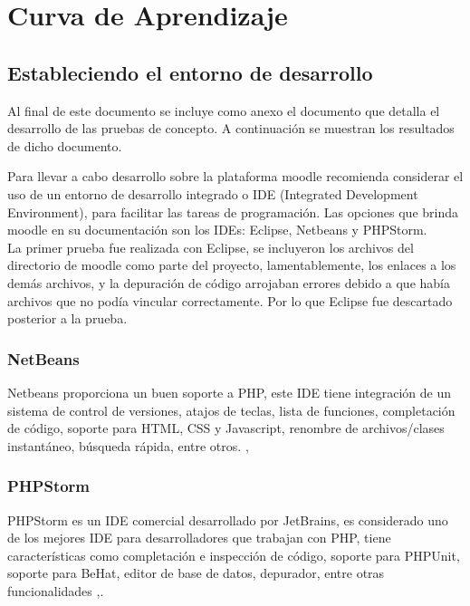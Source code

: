 \chapter{Curva de Aprendizaje}
\label{ch:curvaAprendizaje}

\section{Estableciendo el entorno de desarrollo}

 Al final de este documento se incluye como anexo el documento que detalla el desarrollo de las pruebas de concepto. A continuación se muestran los resultados de dicho documento.

Para llevar a cabo desarrollo sobre la plataforma moodle recomienda considerar el uso de un entorno de desarrollo integrado o IDE (Integrated Development Environment), para facilitar las tareas de programación. Las opciones que brinda moodle en su documentación son los IDEs: Eclipse, Netbeans y PHPStorm.\\

\noindent La primer prueba fue realizada con Eclipse, se incluyeron los archivos del directorio de moodle como parte del proyecto, lamentablemente, los enlaces a los demás archivos, y la depuración de código arrojaban errores debido a que había archivos que no podía vincular correctamente. Por lo que Eclipse fue descartado posterior a la prueba.

\subsection{NetBeans}

Netbeans proporciona un buen soporte a PHP, este IDE tiene integración de un sistema de control de versiones, atajos de teclas, lista de funciones, completación de código, soporte para HTML, CSS y Javascript, renombre de archivos/clases instantáneo, búsqueda rápida, entre otros. \cite{NetBeans},\cite{ moodleNetbeans}


\subsection{PHPStorm}

PHPStorm es un IDE comercial desarrollado por JetBrains, es considerado uno de los mejores IDE para desarrolladores que trabajan con PHP, tiene características como completación e inspección de código, soporte para PHPUnit, soporte para BeHat, editor de base de datos, depurador, entre otras funcionalidades \cite{PHPStorm},\cite{  moodlePHPStorm}.

